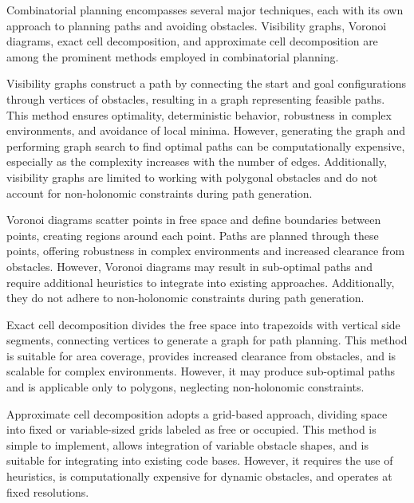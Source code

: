 \vspace*{6mm}

Combinatorial planning encompasses several major techniques, each with its own approach to planning paths and avoiding obstacles. Visibility graphs, Voronoi diagrams, exact cell decomposition, and approximate cell decomposition are among the prominent methods employed in combinatorial planning.

\vspace*{6mm}

Visibility graphs construct a path by connecting the start and goal configurations through vertices of obstacles, resulting in a graph representing feasible paths. This method ensures optimality, deterministic behavior, robustness in complex environments, and avoidance of local minima. However, generating the graph and performing graph search to find optimal paths can be computationally expensive, especially as the complexity increases with the number of edges. Additionally, visibility graphs are limited to working with polygonal obstacles and do not account for non-holonomic constraints during path generation.

\vspace*{6mm}

Voronoi diagrams scatter points in free space and define boundaries between points, creating regions around each point. Paths are planned through these points, offering robustness in complex environments and increased clearance from obstacles. However, Voronoi diagrams may result in sub-optimal paths and require additional heuristics to integrate into existing approaches. Additionally, they do not adhere to non-holonomic constraints during path generation.

\vspace*{6mm}

Exact cell decomposition divides the free space into trapezoids with vertical side segments, connecting vertices to generate a graph for path planning. This method is suitable for area coverage, provides increased clearance from obstacles, and is scalable for complex environments. However, it may produce sub-optimal paths and is applicable only to polygons, neglecting non-holonomic constraints.

\vspace*{6mm}

Approximate cell decomposition adopts a grid-based approach, dividing space into fixed or variable-sized grids labeled as free or occupied. This method is simple to implement, allows integration of variable obstacle shapes, and is suitable for integrating into existing code bases. However, it requires the use of heuristics, is computationally expensive for dynamic obstacles, and operates at fixed resolutions.


